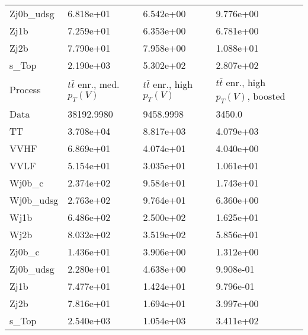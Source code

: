 \begin{table}
{\begin{tabularx}{0.8\textwidth}{|X|X|X|X|}
Zj0b\_udsg & 6.818e+01 & 6.542e+00 & 9.776e+00 \\
Zj1b & 7.259e+01 & 6.353e+00 & 6.781e+00 \\
Zj2b & 7.790e+01 & 7.958e+00 & 1.088e+01 \\
s\_Top & 2.190e+03 & 5.302e+02 & 2.807e+02 \\
\hline
\hline
Process & $t\bar{t}$ enr., med. $p_{T}(V)$ & $t\bar{t}$ enr., high $p_{T}(V)$ & $t\bar{t}$ enr., high $p_{T}(V)$, boosted \\
\hline
Data & 38192.9980 & 9458.9998 & 3450.0 \\
\hline
TT & 3.708e+04 & 8.817e+03 & 4.079e+03 \\
VVHF & 6.869e+01 & 4.074e+01 & 4.040e+00 \\
VVLF & 5.154e+01 & 3.035e+01 & 1.061e+01 \\
Wj0b\_c & 2.374e+02 & 9.584e+01 & 1.743e+01 \\
Wj0b\_udsg & 2.763e+02 & 9.764e+01 & 6.360e+00 \\
Wj1b & 6.486e+02 & 2.500e+02 & 1.625e+01 \\
Wj2b & 8.032e+02 & 3.519e+02 & 5.856e+01 \\
Zj0b\_c & 1.436e+01 & 3.906e+00 & 1.312e+00 \\
Zj0b\_udsg & 2.280e+01 & 4.638e+00 & 9.908e-01 \\
Zj1b & 7.477e+01 & 1.424e+01 & 9.796e-01 \\
Zj2b & 7.816e+01 & 1.694e+01 & 3.997e+00 \\
s\_Top & 2.540e+03 & 1.054e+03 & 3.411e+02 \\
\hline
\end{tabularx}
}
\label{tab:cr-Wen-2016}
\end{table}

